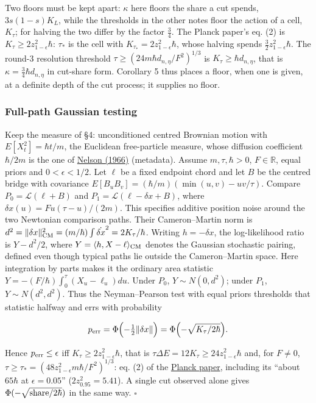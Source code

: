\documentclass[11pt,a4paper]{article}
\begin{document}
Two floors must be kept apart: \(\kappa\) here floors the share a cut
spends, \(3s(1-s)K_L\), while the thresholds in the other notes floor
the action of a cell, \(K_\tau\); for halving the two differ by the
factor \(\frac34\). The Planck paper's eq. (2) is
\(K_\tau\ge2z_{1-\epsilon}^2\hbar\): \(\tau_*\) is the cell with
\(K_{\tau_*}=2z_{1-\epsilon}^2\hbar\), whose halving spends
\(\frac32z_{1-\epsilon}^2\hbar\). The round-3 resolution threshold
\(\tau\ge(24m\hbar d_{n,\eta}/F^2)^{1/3}\) is
\(K_\tau\ge\hbar d_{n,\eta}\), that is
\(\kappa=\frac34\hbar d_{n,\eta}\) in cut-share form. Corollary 5 thus
places a floor, when one is given, at a definite depth of the cut
process; it supplies no floor.

\hypertarget{full-path-gaussian-testing}{%
\subsubsection{Full-path Gaussian
testing}\label{full-path-gaussian-testing}}

Keep the measure of §4: unconditioned centred Brownian motion with
\(E[X_t^2]=\hbar t/m\), the Euclidean free-particle measure, whose
diffusion coefficient \(\hbar/2m\) is the one of
\href{https://doi.org/10.1103/PhysRev.150.1079}{Nelson (1966)}
(metadata). Assume \(m,\tau,\hbar>0\), \(F\in\mathbb R\), equal priors
and \(0<\epsilon<1/2\). Let \(\ell\) be a fixed endpoint chord and let
\(B\) be the centred bridge with covariance
\(E[B_uB_v]=(\hbar/m)(\min(u,v)-uv/\tau)\). Compare
\(P_0=\mathcal L(\ell+B)\) and \(P_1=\mathcal L(\ell-\delta x+B)\),
where \(\delta x(u)=Fu(\tau-u)/(2m)\). This specifies additive position
noise around the two Newtonian comparison paths. Their Cameron--Martin
norm is
\(d^2=\|\delta x\|_{\rm CM}^2=(m/\hbar)\int\dot{\delta x}^2=2K_\tau/\hbar\).
Writing \(h=-\delta x\), the log-likelihood ratio is \(Y-d^2/2\), where
\(Y=\langle h,X-\ell\rangle_{\rm CM}\) denotes the Gaussian stochastic
pairing, defined even though typical paths lie outside the
Cameron--Martin space. Here integration by parts makes it the ordinary
area statistic \(Y=-(F/\hbar)\int_0^\tau(X_u-\ell_u)du\). Under \(P_0\),
\(Y\sim N(0,d^2)\); under \(P_1\), \(Y\sim N(d^2,d^2)\). Thus the
Neyman--Pearson test with equal priors thresholds that statistic halfway
and errs with probability

\[p_{\rm err}=\Phi\Bigl(-\tfrac12\|\delta x\|\Bigr)=\Phi\Bigl(-\sqrt{K_\tau/2\hbar}\Bigr).\]

Hence \(p_{\rm err}\le\epsilon\) iff
\(K_\tau\ge2z_{1-\epsilon}^2\hbar\), that is
\(\tau\Delta E=12K_\tau\ge24z_{1-\epsilon}^2\hbar\) and, for \(F\ne0\),
\(\tau\ge\tau_*=(48z_{1-\epsilon}^2m\hbar/F^2)^{1/3}\): eq. (2) of the
\href{planck-gap-paper.md}{Planck paper}, including its ``about
\(65\hbar\) at \(\epsilon=0.05\)'' (\(2z_{0.95}^2=5.41\)). A single cut
observed alone gives \(\Phi(-\sqrt{{\rm share}/2\hbar})\) in the same
way. \(\square\)
\end{document}
